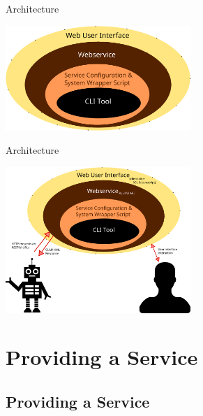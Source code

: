 \documentclass[xcolor=table,10pt,t]{beamer}
\begin{document}
\begin{frame}{Architecture}

    \begin{center}
    \includegraphics[width=70.0mm]{architecture2015_1.png}
    \end{center}

\end{frame}

\begin{frame}{Architecture}

    \begin{center}
    \includegraphics[width=70.0mm]{architecture2015_0.png}
    \end{center}

\end{frame}


\section{Providing a Service}

\subsection{Providing a Service}
\end{document}
